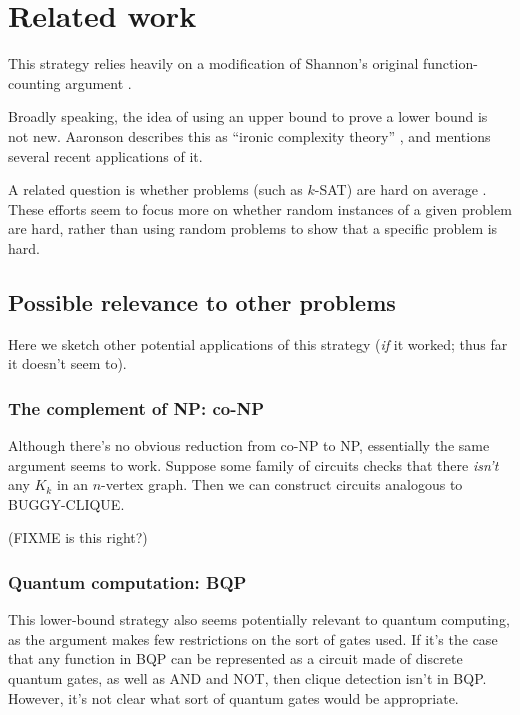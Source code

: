 \documentclass[12pt]{article}
\theoremstyle{definition}
\begin{document}
\section{Related work}

This strategy relies heavily on a modification of Shannon's original
function-counting argument \cite{shannon_synthesis_1949}.

Broadly speaking, the idea of using an upper bound to prove a lower bound
is not new. Aaronson describes this as ``ironic complexity theory''
\cite{aaronson_pnp}, and mentions several recent applications of it.

A related question is whether problems
(such as $k$-SAT) are
hard on average \cite{bogdanov2006average}.
These efforts seem to focus more on whether
random
instances of a given problem are hard, rather
than using random problems to show that
a specific problem is hard.

\subsection{Possible relevance to other problems}

Here we sketch other potential applications of this strategy
({\em if} it worked; thus far it doesn't seem to).

\subsubsection{The complement of NP: co-NP}

Although there's no obvious reduction from co-NP to NP, essentially
the same argument seems to work. Suppose some family of circuits
checks that there {\em isn't} any $K_k$ in an $n$-vertex graph.
Then we can construct circuits analogous to BUGGY-CLIQUE.

(FIXME is this right?)

\subsubsection{Quantum computation: BQP}

This lower-bound strategy also seems potentially
relevant to quantum computing,
as the argument makes few restrictions on the sort of gates used.
If it's the case that any function in BQP can be represented
as a circuit made of discrete quantum gates, as well as AND and NOT,
then clique detection isn't in BQP.
However, it's not clear what sort of quantum gates would be
appropriate.
\end{document}

